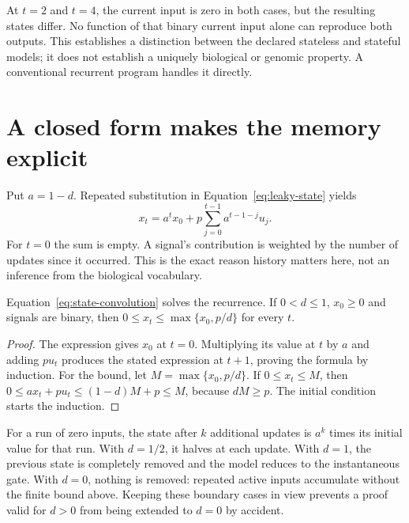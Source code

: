\begin{table}[htbp]
\centering

\caption{An exact synthetic pulse response in arbitrary state units.
The table reports the state before and after each discrete input, alongside
an instantaneous gate. No biological measurement or fitted rate is used.}
\label{tab:state}
\end{table}

At $t=2$ and $t=4$, the current input is zero in both cases, but the resulting
states differ. No function of that binary current input alone can reproduce
both outputs. This establishes a distinction between the declared stateless
and stateful models; it does not establish a uniquely biological or genomic
property. A conventional recurrent program handles it directly.

\section{A closed form makes the memory explicit}
Put $a=1-d$. Repeated substitution in Equation~\ref{eq:leaky-state} yields
\begin{equation}
 x_t=a^t x_0+p\sum_{j=0}^{t-1}a^{t-1-j}u_j.
 \label{eq:state-convolution}
\end{equation}
For $t=0$ the sum is empty. A signal's contribution is weighted by the number
of updates since it occurred. This is the exact reason history matters here,
not an inference from the biological vocabulary.

\begin{proposition}
Equation~\ref{eq:state-convolution} solves the recurrence. If $0<d\leq1$,
$x_0\geq0$ and signals are binary, then
$0\leq x_t\leq\max\{x_0,p/d\}$ for every $t$.
\end{proposition}
\begin{proof}
The expression gives $x_0$ at $t=0$. Multiplying its value at $t$ by $a$ and
adding $p u_t$ produces the stated expression at $t+1$, proving the formula
by induction. For the bound, let $M=\max\{x_0,p/d\}$. If $0\leq x_t\leq M$,
then $0\leq a x_t+p u_t\leq(1-d)M+p\leq M$, because $dM\geq p$.
The initial condition starts the induction.
\end{proof}

For a run of zero inputs, the state after $k$ additional updates is $a^k$
times its initial value for that run. With $d=1/2$, it halves at each update.
With $d=1$, the previous state is completely removed and the model reduces to
the instantaneous gate. With $d=0$, nothing is removed: repeated active inputs
accumulate without the finite bound above. Keeping these boundary cases in
view prevents a proof valid for $d>0$ from being extended to $d=0$ by accident.

